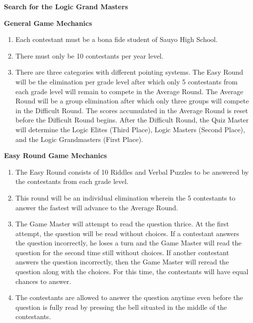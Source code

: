 \documentclass[11pt]{article}
\begin{document}
 

\begin{center}
\textbf{Search for the Logic Grand Masters}
\end{center} 

\textbf{General Game Mechanics} 
{\begin{enumerate}[label = \arabic*. ]
\item Each contestant must be a bona fide student of Sauyo High School. 
\item There must only be 10 contestants per year level. 
\item There are three categories with different pointing systems. The Easy Round will be the elimination per grade level after which only 5 contestants from each grade level will remain to compete in the Average Round. The Average Round will be a group elimination after which only three groups will compete in the Difficult Round. The scores accumulated in the Average Round is reset before the Difficult Round begins. After the Difficult Round, the Quiz Master will determine the Logic Elites (Third Place), Logic Masters (Second Place), and the Logic Grandmasters (First Place). 

\end{enumerate}}

\textbf{Easy Round Game Mechanics} 
\begin{enumerate}[label = \arabic*. ]
\item The Easy Round consists of 10 Riddles and Verbal Puzzles to be answered by the contestants from each grade level. 
\item This round will be an individual elimination wherein the 5 contestants to answer the fastest will advance to the Average Round. 
\item The Game Master will attempt to read the question thrice. At the first attempt, the question will be read without choices. If a contestant answers the question incorrectly, he loses a turn and the Game Master will read the question for the second time still without choices. If another contestant answers the question incorrectly, then the Game Master will reread the question along with the choices. For this time, the contestants will have equal chances to answer. 
\item The contestants are allowed to answer the question anytime even before the question is fully read by pressing the bell situated in the middle of the contestants. 
\end{enumerate} 
\end{document}
